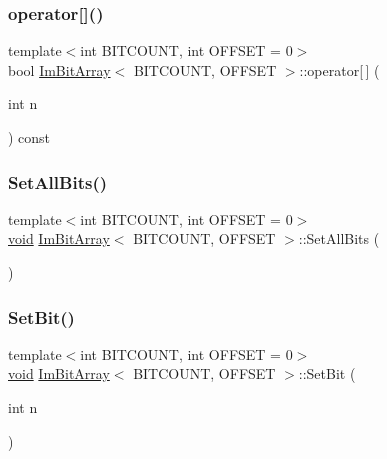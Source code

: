 \mbox{\label{structImBitArray_ae1b3a57b35efd1f1ffb51629cce38c14}} 
\subsubsection{\texorpdfstring{operator[]()}{operator[]()}}
{\footnotesize\ttfamily template$<$int B\+I\+T\+C\+O\+U\+NT, int O\+F\+F\+S\+ET = 0$>$ \\
bool \hyperlink{structImBitArray}{Im\+Bit\+Array}$<$ B\+I\+T\+C\+O\+U\+NT, O\+F\+F\+S\+ET $>$\+::operator\mbox{[}$\,$\mbox{]} (\begin{DoxyParamCaption}\item[{int}]{n }\end{DoxyParamCaption}) const\hspace{0.3cm}{\ttfamily [inline]}}

\mbox{\label{structImBitArray_a52c1f3ec6a89c91e2090bf75e00152ac}} 
\subsubsection{\texorpdfstring{Set\+All\+Bits()}{SetAllBits()}}
{\footnotesize\ttfamily template$<$int B\+I\+T\+C\+O\+U\+NT, int O\+F\+F\+S\+ET = 0$>$ \\
\hyperlink{imgui__impl__opengl3__loader_8h_ac668e7cffd9e2e9cfee428b9b2f34fa7}{void} \hyperlink{structImBitArray}{Im\+Bit\+Array}$<$ B\+I\+T\+C\+O\+U\+NT, O\+F\+F\+S\+ET $>$\+::Set\+All\+Bits (\begin{DoxyParamCaption}{ }\end{DoxyParamCaption})\hspace{0.3cm}{\ttfamily [inline]}}

\mbox{\label{structImBitArray_a8c4d1a352cbd565200c8fe983c879022}} 
\subsubsection{\texorpdfstring{Set\+Bit()}{SetBit()}}
{\footnotesize\ttfamily template$<$int B\+I\+T\+C\+O\+U\+NT, int O\+F\+F\+S\+ET = 0$>$ \\
\hyperlink{imgui__impl__opengl3__loader_8h_ac668e7cffd9e2e9cfee428b9b2f34fa7}{void} \hyperlink{structImBitArray}{Im\+Bit\+Array}$<$ B\+I\+T\+C\+O\+U\+NT, O\+F\+F\+S\+ET $>$\+::Set\+Bit (\begin{DoxyParamCaption}\item[{int}]{n }\end{DoxyParamCaption})\hspace{0.3cm}{\ttfamily [inline]}}

